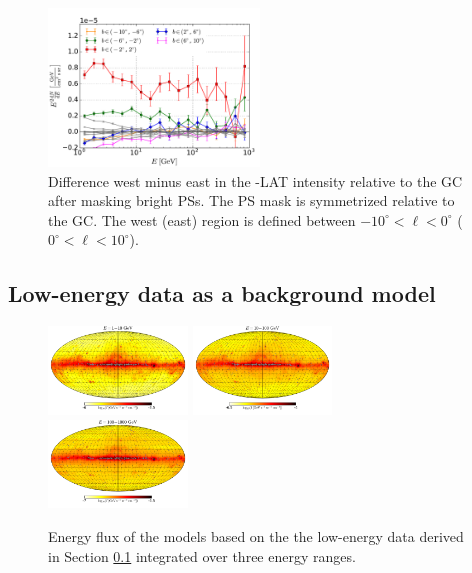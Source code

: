 \begin{figure}[h]
\centering
 \includegraphics[width=0.5\textwidth]{plots/Difference_data_for_different_latitudes.pdf}
 \caption{Difference west minus east in the \Fermi-LAT intensity relative to the GC after masking bright PSs.
 The PS mask is symmetrized relative to the GC.
 The west (east) region is defined between $-10^\circ < \ell <0^\circ$ ($0^\circ < \ell <10^\circ$). }
 \label{fig:data_diff}
\end{figure}

\subsection{Low-energy data as a background model}
\label{sec:le_data_model}

\begin{figure}[t]
\includegraphics[width=0.33\textwidth]{plots/Mollweide_LowE_model_03-10GeV_flux_source_range_0_log.pdf}
\includegraphics[width=0.33\textwidth]{plots/Mollweide_LowE_model_03-10GeV_flux_source_range_1_log.pdf}
\includegraphics[width=0.33\textwidth]{plots/Mollweide_LowE_model_03-10GeV_flux_source_range_2_log.pdf}
\caption{Energy flux of the models based on the the low-energy data derived in Section \ref{sec:le_data_model}
integrated over three energy ranges. }
\label{fig:Maps_lowE_model}
\end{figure}


